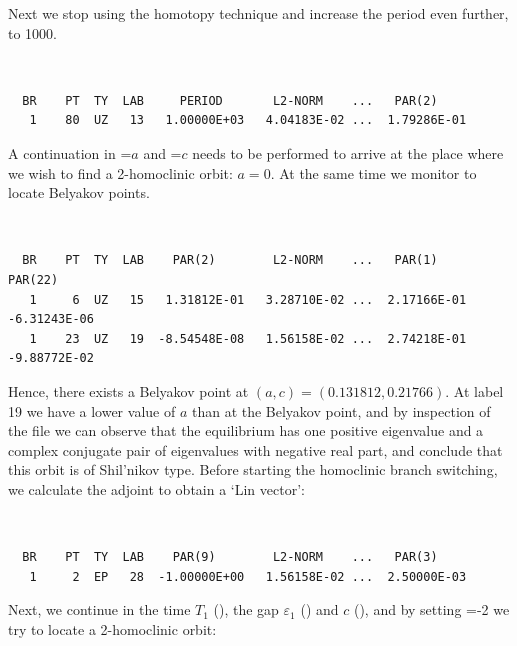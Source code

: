 \documentclass[12pt]{report}
\begin{document}
Next we stop using the homotopy technique and increase the period even
further, to 1000.
\begin{center}
\\
\end{center}
\begin{verbatim}
  BR    PT  TY  LAB     PERIOD       L2-NORM    ...   PAR(2)
   1    80  UZ   13   1.00000E+03   4.04183E-02 ...  1.79286E-01
\end{verbatim}

A continuation in =$a$ and =$c$ needs to be 
performed to arrive
at the place where we wish to find a 2-homoclinic orbit: $a=0$. At the
same time we monitor  to locate Belyakov points.
\begin{center}
\\
\end{center}
\begin{verbatim}
  BR    PT  TY  LAB    PAR(2)        L2-NORM    ...   PAR(1)        PAR(22)
   1     6  UZ   15   1.31812E-01   3.28710E-02 ...  2.17166E-01  -6.31243E-06
   1    23  UZ   19  -8.54548E-08   1.56158E-02 ...  2.74218E-01  -9.88772E-02
\end{verbatim}
Hence, there exists a Belyakov point at $(a,c)=(0.131812,0.21766)$.
At label 19 we have a lower value of $a$ than at the Belyakov point,
and by inspection of the file
 we can observe that the equilibrium has one positive
eigenvalue and a complex conjugate pair of eigenvalues with negative
real part, and conclude that this orbit is of Shil'nikov type.
Before starting the homoclinic branch switching, we calculate
the adjoint to obtain a `Lin vector':
\begin{center}
\\
\end{center}
\begin{verbatim}
  BR    PT  TY  LAB    PAR(9)        L2-NORM    ...   PAR(3)     
   1     2  EP   28  -1.00000E+00   1.56158E-02 ...  2.50000E-03
\end{verbatim}
Next, we continue in the time $T_1$ (), the gap
$\varepsilon_1$ () and $c$ (), 
and by setting =-2
we try to locate a 2-homoclinic orbit:
\begin{center}
\\
\end{center}
\end{document}
